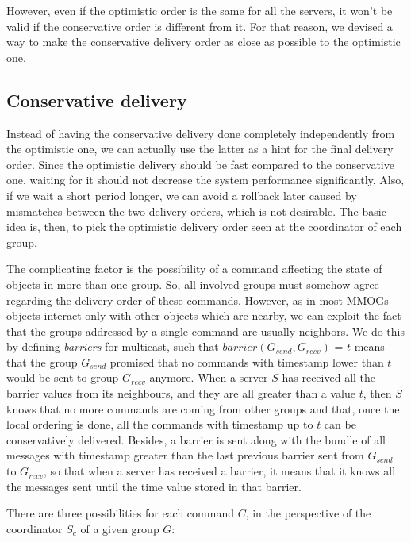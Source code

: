 \documentclass[times, 10pt]{article}
\begin{document}
However, even if the optimistic order is the same for all the servers, it won't be valid if the conservative order is different from it. For that reason, we devised a way to make the conservative delivery order as close as possible to the optimistic one.

\subsection{Conservative delivery}

Instead of having the conservative delivery done completely independently from the optimistic one, we can actually use the latter as a hint for the final delivery order. Since the optimistic delivery should be fast compared to the conservative one, waiting for it should not decrease the system performance significantly. Also, if we wait a short period longer, we can avoid a rollback later caused by mismatches between the two delivery orders, which is not desirable. The basic idea is, then, to pick the optimistic delivery order seen at the coordinator of each group.

The complicating factor is the possibility of a command affecting the state of objects in more than one group. So, all involved groups must somehow agree regarding the delivery order of these commands. However, as in most MMOGs objects interact only with other objects which are nearby, we can exploit the fact that the groups addressed by a single command are usually neighbors. We do this by defining \emph{barriers} for multicast, such that $barrier(G_{send},G_{recv})$ = $t$ means that the group $G_{send}$ promised that no commands with timestamp lower than $t$ would be sent to group $G_{recv}$ anymore. When a server $S$ has received all the barrier values from its neighbours, and they are all greater than a value $t$, then $S$ knows that no more commands are coming from other groups and that, once the local ordering is done, all the commands with timestamp up to $t$ can be conservatively delivered. Besides, a barrier is sent along with the bundle of all messages with timestamp greater than the last previous barrier sent from $G_{send}$ to $G_{recv}$, so that when a server has received a barrier, it means that it knows all the messages sent until the time value stored in that barrier. 

There are three possibilities for each command $C$, in the perspective of the coordinator $S_c$ of a given group $G$:
\end{document}
